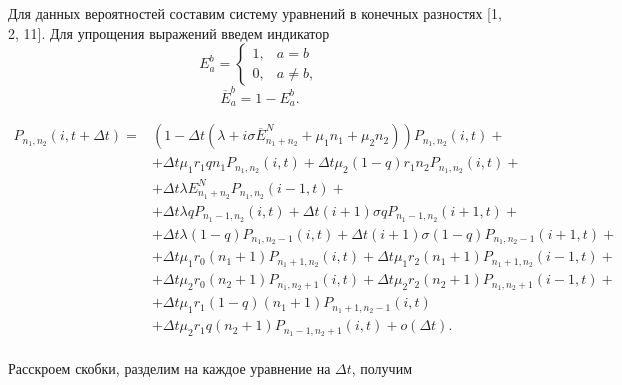 \setlength\parindent{12.5mm}
Для данных вероятностей составим систему уравнений в конечных разностях [1, 2, 11]. 
Для упрощения выражений введем индикатор
\begin{equation*}
	E_a^b = 
	\begin{cases}
		1, &{a=b}\\
		0, &{a \neq b},
	\end{cases}
\end{equation*}
\begin{equation*}
	\overline{E}_{a}^b = 1 - E_a^b.
\end{equation*}

\begin{equation*}
	\begin{split}	
		P_{n_{1}, n_{2}}(i,t+\Delta t)=&(1-\Delta t(\lambda+i\sigma \overline{E}_{n_{1}+n_{2}}^N+\mu_{1}n_{1}+\mu_{2}n_{2}))P_{n_{1}, n_{2}}(i,t)+\\
		&+\Delta t\mu_{1}r_{1}qn_{1}P_{n_{1}, n_{2}}(i,t)+\Delta t \mu_{2}(1-q)r_{1}n_{2}P_{n_{1}, n_{2}}(i,t)+\\
		&+\Delta t \lambda E_{n_{1}+n_{2}}^N P_{n_{1}, n_{2}}(i-1,t)+\\
		&+\Delta t\lambda qP_{n_{1}-1, n_{2}}(i,t) + \Delta t(i+1) \sigma q P_{n_{1}-1, n_{2}}(i+1,t)+\\
		&+\Delta t\lambda (1-q)P_{n_{1}, n_{2}-1}(i,t) + \Delta t(i+1) \sigma (1-q) P_{n_{1}, n_{2}-1}(i+1,t)+\\
		&+\Delta t \mu_{1} r_{0}(n_{1}+1) P_{n_{1} +1 , n_{2}}(i,t) + \Delta t \mu_{1} r_{2} (n_{1}+1) P_{n_{1} + 1, n_{2}}(i-1,t)+\\
		&+\Delta t \mu_{2} r_{0}(n_{2}+1) P_{n_{1}, n_{2} + 1 }(i,t) + \Delta t\mu_{2} r_{2} (n_{2}+1) P_{n_{1}, n_{2} + 1}(i-1,t)+\\
		&+\Delta t\mu_{1} r_{1}(1-q)(n_{1}+1) P_{n_{1} +1 , n_{2}-1}(i,t)\\
		&+\Delta t\mu_{2} r_{1}q (n_{2}+1)P_{n_{1} -1 , n_{2}+1}(i,t)+o(\Delta t).\\
\end{split}
\end{equation*}

Расскроем скобки, разделим на каждое уравнение на $\Delta t$, получим

